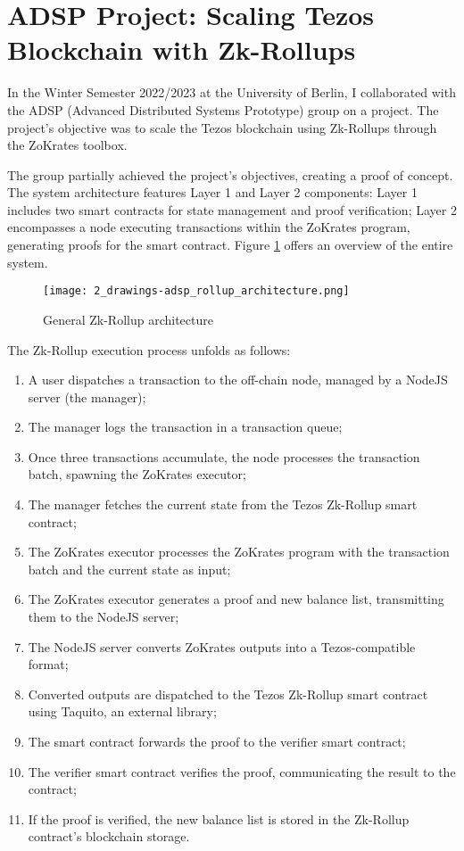 \section{ADSP Project: Scaling Tezos Blockchain with Zk-Rollups \label{sec:2_adspProject}}

In the Winter Semester 2022/2023 at the University of Berlin, I collaborated with the ADSP (Advanced Distributed Systems Prototype) group on a project. The project's objective was to scale the Tezos blockchain using Zk-Rollups through the ZoKrates toolbox.

The group partially achieved the project's objectives, creating a proof of concept. The system architecture features Layer 1 and Layer 2 components: Layer 1 includes two smart contracts for state management and proof verification; Layer 2 encompasses a node executing transactions within the ZoKrates program, generating proofs for the smart contract. Figure \ref{fig:2_general_rollup_architecture} offers an overview of the entire system.

\begin{figure}[ht]
  \centering
  \texttt{[image: 2\_drawings-adsp\_rollup\_architecture.png]}
  \caption[Zk-Rollup Architecture]{General Zk-Rollup architecture}  
  \label{fig:2_general_rollup_architecture}
\end{figure}

The Zk-Rollup execution process unfolds as follows:
\begin{enumerate}
    \item A user dispatches a transaction to the off-chain node, managed by a NodeJS server (the manager);
    \item The manager logs the transaction in a transaction queue;
    \item Once three transactions accumulate, the node processes the transaction batch, spawning the ZoKrates executor;
    \item The manager fetches the current state from the Tezos Zk-Rollup smart contract;
    \item The ZoKrates executor processes the ZoKrates program with the transaction batch and the current state as input;
    \item The ZoKrates executor generates a proof and new balance list, transmitting them to the NodeJS server;
    \item The NodeJS server converts ZoKrates outputs into a Tezos-compatible format;
    \item Converted outputs are dispatched to the Tezos Zk-Rollup smart contract using Taquito, an external library;
    \item The smart contract forwards the proof to the verifier smart contract;
    \item The verifier smart contract verifies the proof, communicating the result to the contract;
    \item If the proof is verified, the new balance list is stored in the Zk-Rollup contract's blockchain storage.
\end{enumerate}

